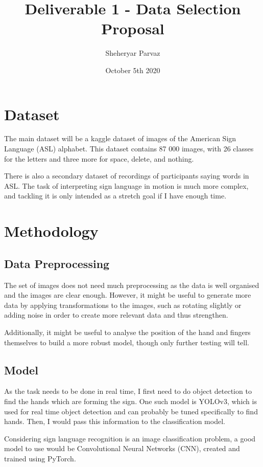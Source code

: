 \documentclass[12pt]{article}
\title{\vspace{-6ex}Deliverable 1 - Data Selection Proposal}
\author{Sheheryar Parvaz}
\date{October 5th 2020}
\begin{document}
\maketitle

\section{Dataset}
The main dataset will be a kaggle dataset of images of the American Sign
Language (ASL) alphabet\cite{data-images}. This dataset contains 87 000
images, with 26 classes for the letters and three more for space,
delete, and nothing.

There is also a secondary dataset of recordings of participants saying
words in ASL\cite{data-videos}. The task of interpreting sign language
in motion is much more complex, and tackling it is only intended as a
stretch goal if I have enough time.

\section{Methodology}
\subsection{Data Preprocessing}
The set of images does not need much preprocessing as the data is well
organised and the images are clear enough. However, it might be useful
to generate more data by applying transformations to the images, such as
rotating slightly or adding noise in order to create more relevant data
and thus strengthen.

Additionally, it might be useful to analyse the position of the hand and
fingers themselves to build a more robust model, though only further
testing will tell.

\subsection{Model}
As the task needs to be done in real time, I first need to do object
detection to find the hands which are forming the sign. One such model is
YOLOv3\cite{yolo}, which is used for real time object detection and can
probably be tuned specifically to find hands. Then, I would pass
this information to the classification model.

Considering sign language recognition is an image classification
problem, a good model to use would be Convolutional Neural Networks
(CNN), created and trained using PyTorch.
\end{document}
